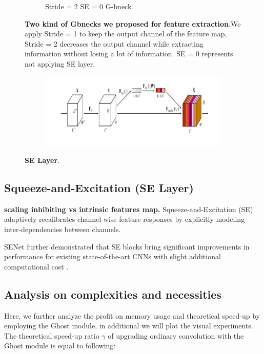 \begin{figure}[h]
\begin{center}
\begin{subfigure}[b]{0.49\textwidth}
			\caption{Stride = 2 SE = 0 G-bneck}
			\label{fig:cellnet}
		\end{subfigure}
	\end{center}
	\caption{\textbf{Two kind of Gbnecks we proposed for feature extraction}.We apply Stride = 1 to keep the output channel of the feature map, Stride = 2 decreases the output channel while extracting information without losing a lot of information. SE = 0 represents not applying SE layer.}
\end{figure}

\begin{figure}[h]
	\begin{center}
		\begin{subfigure}[b]{\textwidth}
		    \centering
			\includegraphics[width=\textwidth]{thesis-template-master/images/SElayer.png}
			\label{fig:cellnet}
		\end{subfigure}
	\end{center}
	\caption{\textbf{SE Layer}.}
\end{figure}

\subsection{Squeeze-and-Excitation (SE Layer)} %
\label{sub:amet}

\textbf{scaling inhibiting vs intrinsic features map.} Squeeze-and-Excitation (SE)\cite{b24} adaptively recalibrates channel-wise feature responses by explicitly modeling inter-dependencies between channels. 

SENet further demonstrated that SE blocks bring significant improvements in performance for existing state-of-the-art CNNs with slight additional computational cost \cite{b24}. 



\subsection{Analysis on complexities and necessities} %
\label{sub:dolor_sit}
Here, we further analyze the profit on memory usage and theoretical speed-up by employing the Ghost module, in additional we will plot the visual experiments. The theoretical speed-up ratio $\gamma$ of upgrading ordinary convolution with the Ghost module is equal to following:


